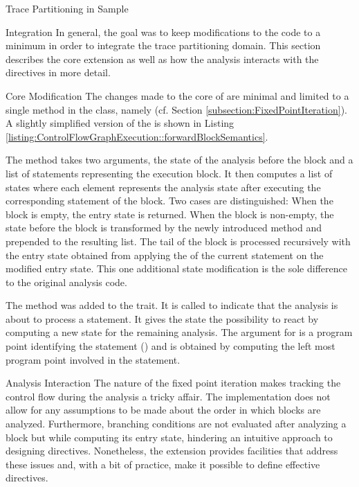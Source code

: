 \begin{chapter}{Trace Partitioning in Sample}
\begin{section}{Integration}
		In general, the goal was to keep modifications to the \sample code to a minimum in order to integrate the trace partitioning domain. This section describes the core extension as well as how the analysis interacts with the directives in more detail.

		
		\begin{subsection}{Core Modification}
			The changes made to the core of \sample are minimal and limited to a single method in the  class, namely  (cf. Section \ref{subsection:FixedPointIteration}). A slightly simplified version of the  is shown in Listing \ref{listing:ControlFlowGraphExecution::forwardBlockSemantics}.

			

			The method takes two arguments, the state of the analysis before the block and a list of statements representing the execution block. It then computes a list of states where each element represents the analysis state after executing the corresponding statement of the block. Two cases are distinguished: When the block is empty, the entry state is returned. When the block is non-empty, the state before the block is transformed by the newly introduced  method and prepended to the resulting list. The tail of the block is processed recursively with the entry state obtained from applying the  of the current statement on the modified entry state. This one additional state modification is the sole difference to the original analysis code.

			The  method was added to the  trait. It is called to indicate that the analysis is about to process a statement. It gives the state the possibility to react by computing a new state for the remaining analysis. The argument for  is a program point identifying the statement () and is obtained by computing the left most program point involved in the statement.
		\end{subsection}


		\begin{subsection}{Analysis Interaction}
			The nature of the fixed point iteration makes tracking the control flow during the analysis a tricky affair. The implementation does not allow for any assumptions to be made about the order in which blocks are analyzed. Furthermore, branching conditions are not evaluated after analyzing a block but while computing its entry state, hindering an intuitive approach to designing directives. Nonetheless, the extension provides facilities that address these issues and, with a bit of practice, make it possible to define effective directives.


\end{subsection}
\end{section}
\end{chapter}
